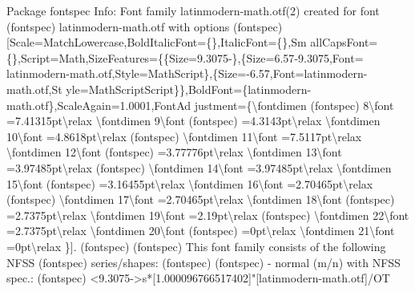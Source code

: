 \documentclass[
  letterpaper,
  DIV=11,
  numbers=noendperiod]{scrartcl}
\newenvironment{Shaded}{\begin{snugshade}}{\end{snugshade}}
\newcommand{\NormalTok}[1]{\textcolor[rgb]{0.00,0.23,0.31}{#1}}
\begin{document}
\begin{Shaded}
\begin{Highlighting}[]
\NormalTok{Package fontspec Info: Font family \textquotesingle{}latinmodern{-}math.otf(2)\textquotesingle{} created for font}
\NormalTok{(fontspec)             \textquotesingle{}latinmodern{-}math.otf\textquotesingle{} with options}
\NormalTok{(fontspec)             [Scale=MatchLowercase,BoldItalicFont=\{\},ItalicFont=\{\},Sm}
\NormalTok{allCapsFont=\{\},Script=Math,SizeFeatures=\{\{Size=9.3075{-}\},\{Size=6.57{-}9.3075,Font=}
\NormalTok{latinmodern{-}math.otf,Style=MathScript\},\{Size={-}6.57,Font=latinmodern{-}math.otf,St}
\NormalTok{yle=MathScriptScript\}\},BoldFont=\{latinmodern{-}math.otf\},ScaleAgain=1.0001,FontAd}
\NormalTok{justment=\{\textbackslash{}fontdimen}
\NormalTok{(fontspec)             8\textbackslash{}font =7.41315pt\textbackslash{}relax \textbackslash{}fontdimen 9\textbackslash{}font}
\NormalTok{(fontspec)             =4.3143pt\textbackslash{}relax \textbackslash{}fontdimen 10\textbackslash{}font =4.8618pt\textbackslash{}relax}
\NormalTok{(fontspec)             \textbackslash{}fontdimen 11\textbackslash{}font =7.5117pt\textbackslash{}relax \textbackslash{}fontdimen 12\textbackslash{}font}
\NormalTok{(fontspec)             =3.77776pt\textbackslash{}relax \textbackslash{}fontdimen 13\textbackslash{}font =3.97485pt\textbackslash{}relax}
\NormalTok{(fontspec)             \textbackslash{}fontdimen 14\textbackslash{}font =3.97485pt\textbackslash{}relax \textbackslash{}fontdimen 15\textbackslash{}font}
\NormalTok{(fontspec)             =3.16455pt\textbackslash{}relax \textbackslash{}fontdimen 16\textbackslash{}font =2.70465pt\textbackslash{}relax}
\NormalTok{(fontspec)             \textbackslash{}fontdimen 17\textbackslash{}font =2.70465pt\textbackslash{}relax \textbackslash{}fontdimen 18\textbackslash{}font}
\NormalTok{(fontspec)             =2.7375pt\textbackslash{}relax \textbackslash{}fontdimen 19\textbackslash{}font =2.19pt\textbackslash{}relax}
\NormalTok{(fontspec)             \textbackslash{}fontdimen 22\textbackslash{}font =2.7375pt\textbackslash{}relax \textbackslash{}fontdimen 20\textbackslash{}font}
\NormalTok{(fontspec)             =0pt\textbackslash{}relax \textbackslash{}fontdimen 21\textbackslash{}font =0pt\textbackslash{}relax \}].}
\NormalTok{(fontspec)              }
\NormalTok{(fontspec)              This font family consists of the following NFSS}
\NormalTok{(fontspec)             series/shapes:}
\NormalTok{(fontspec)              }
\NormalTok{(fontspec)             {-} \textquotesingle{}normal\textquotesingle{} (m/n) with NFSS spec.:}
\NormalTok{(fontspec)             \textless{}9.3075{-}\textgreater{}s*[1.000096766517402]"[latinmodern{-}math.otf]/OT}

\end{Highlighting}
\end{Shaded}
\end{document}
